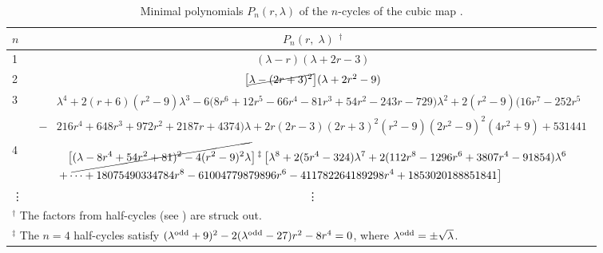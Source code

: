 \documentclass[twocolumn]{revtex4-1}
\begin{document}
\begin{table*}[t]\footnotesize
  \caption{
  Minimal polynomials $P_n(r, \lambda)$ of
  the $n$-cycles of the cubic map .
  }
\begin{center}
\begin{tabular}{lc}
\hline
  $n$
& $P_n(r, \; \lambda)$ $^\dagger$
\\
\hline
1
&
$(\lambda - r) (\lambda + 2 r - 3)$
\\
2
&
  $
  \big[
  \cancel{\lambda - (2r+3)^2}
  \big]
  (\lambda + 2r^2 - 9)
  $
\\
3
&
$\begin{aligned}
  &\lambda^4
  + 2 (r+6)(r^2-9) \lambda^3
  -6 \big(8 r^6+12 r^5-66 r^4-81 r^3+54 r^2-243 r-729\big)
  \lambda^2
+2 (r^2-9) \big(16 r^7-252 r^5\\
-&216 r^4 +648 r^3+972 r^2+2187 r+4374\big) \lambda
+2 r (2r-3) (2 r+3)^2 (r^2-9) (2 r^2 - 9)^2 (4 r^2+9) + 531441
\end{aligned}$
\\
4
&
\begin{minipage}{.97\linewidth}
\vspace*{1mm}
$\begin{aligned}
&\big[ \cancel{
  (\lambda-8r^4+54r^2+81)^2
-4 (r^2-9)^2 \lambda
} \big]
\,^\ddagger\,
\big[
\lambda^8
+2(5 r^4-324) \lambda^7
+2(112 r^8-1296 r^6+3807 r^4-91854) \lambda^6 \\
+&\dots
+18075490334784 r^8
-61004779879896 r^6
-411782264189298 r^4
+1853020188851841
\big]
\end{aligned}$
\end{minipage}
\\
\vdots & \vdots
\\
\hline
\multicolumn{2}{p{\textwidth}}{
$^\dagger$
The factors from half-cycles (see {halfcycle}) are struck out.
}\\
\multicolumn{2}{p{\textwidth}}{
$^\ddagger$
The $n = 4$ half-cycles satisfy
$(\lambda^{\mathrm{odd}} + 9)^2 - 2(\lambda^{\mathrm{odd}}-27) r^2 - 8 r^4 = 0$,
  where $\lambda^{\mathrm{odd}}=\pm\sqrt\lambda$.
} \\
\hline
\end{tabular}
\end{center}
\label{tab:cubpolygen}
\end{table*}
\end{document}
